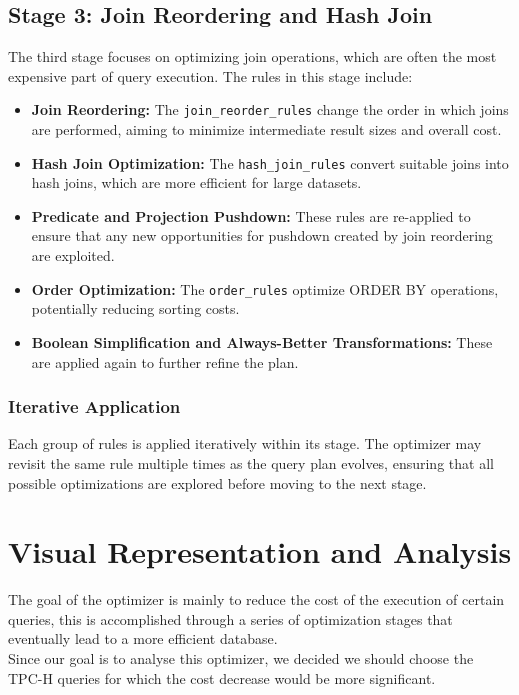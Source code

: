 \documentclass[a4paper,12pt]{scrreprt}
\begin{document}
\section{Stage 3: Join Reordering and Hash Join}
The third stage focuses on optimizing join operations, which are often the most expensive part of query execution. The rules in this stage include:
\begin{itemize}
    \item \textbf{Join Reordering:} The \texttt{join\_reorder\_rules} change the order in which joins are performed, aiming to minimize intermediate result sizes and overall cost.
    \item \textbf{Hash Join Optimization:} The \texttt{hash\_join\_rules} convert suitable joins into hash joins, which are more efficient for large datasets.
    \item \textbf{Predicate and Projection Pushdown:} These rules are re-applied to ensure that any new opportunities for pushdown created by join reordering are exploited.
    \item \textbf{Order Optimization:} The \texttt{order\_rules} optimize ORDER BY operations, potentially reducing sorting costs.
    \item \textbf{Boolean Simplification and Always-Better Transformations:} These are applied again to further refine the plan.
\end{itemize}

\subsection{Iterative Application}
Each group of rules is applied iteratively within its stage. The optimizer may revisit the same rule multiple times as the query plan evolves, ensuring that all possible optimizations are explored before moving to the next stage.


\chapter{Visual Representation and Analysis} \label{chap:concDesenho}
The goal of the optimizer is mainly to reduce the cost of the execution of certain queries, this is accomplished through a series of optimization stages that eventually lead to a more efficient database. \\
Since our goal is to analyse this optimizer, we decided we should choose the TPC-H queries for which the cost decrease would be more significant. \\
\end{document}
